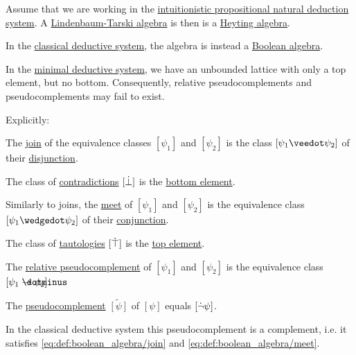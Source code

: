 \begin{proposition}\label{thm:intuitionistic_lindenbaum_tarski_algebra}
  Assume that we are working in the \hyperref[def:intuitionistic_propositional_deduction_systems]{intuitionistic propositional natural deduction system}. A \hyperref[def:lindenbaum_tarski_algebra]{Lindenbaum-Tarski algebra} is then is a \hyperref[def:heyting_algebra]{Heyting algebra}.

  In the \hyperref[def:classical_propositional_deduction_systems]{classical deductive system}, the algebra is instead a \hyperref[def:boolean_algebra]{Boolean algebra}.

  In the \hyperref[def:minimal_implicational_logic]{minimal deductive system}, we have an unbounded lattice with only a top element, but no bottom. Consequently, relative pseudocomplements and pseudocomplements may fail to exist.

  Explicitly:
  \begin{thmenum}
     The \hyperref[def:lattice/join]{join} of the equivalence classes \( [\psi_1] \) and \( [\psi_2] \) is the class \( [\psi_1 \synvee \psi_2] \) of their \hyperref[def:propositional_alphabet/connectives/disjunction]{disjunction}.

     The class of \hyperref[def:propositional_contradiction]{contradictions} \( [\dot\bot] \) is the \hyperref[def:extremal_points/top_and_bottom]{bottom element}.

     Similarly to joins, the \hyperref[def:lattice/meet]{meet} of \( [\psi_1] \) and \( [\psi_2] \) is the equivalence class \( [\psi_1 \synwedge \psi_2] \) of their \hyperref[def:propositional_alphabet/connectives/conjunction]{conjunction}.

     The class of \hyperref[def:propositional_tautology]{tautologies} \( [\dot\top] \) is the \hyperref[def:extremal_points/top_and_bottom]{top element}.

     The \hyperref[def:heyting_algebra]{relative pseudocomplement} of \( [\psi_1] \) and \( [\psi_2] \) is the equivalence class \( [\psi_1 \synimplies \psi_2] \).

     The \hyperref[eq:def:heyting_algebra/pseudocomplement]{pseudocomplement} \( \widetilde{[\psi]} \) of \( [\psi] \) equals \( [\dot\neg \psi] \).

    In the classical deductive system this pseudocomplement is a complement, i.e. it satisfies \eqref{eq:def:boolean_algebra/join} and \eqref{eq:def:boolean_algebra/meet}.
  \end{thmenum}
\end{proposition}
